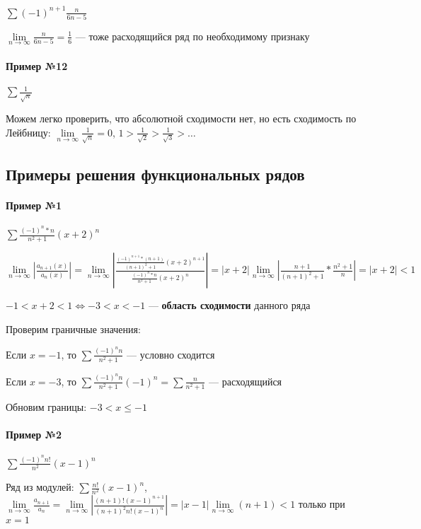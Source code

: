 \documentclass{article}
\begin{document}
$\sum (-1)^{n + 1} \frac{n}{6 n - 5}$

$\lim\limits_{n \to \infty} \frac{n}{6 n - 5} = \frac{1}{6}$ — тоже расходящийся ряд по необходимому признаку

\paragraph{Пример №12}

$\sum \frac{1}{\sqrt{n}}$

Можем легко проверить, что абсолютной сходимости нет, но есть сходимость по Лейбницу: $\lim\limits_{n \to \infty} \frac{1}{\sqrt{n}} = 0$, $1 > \frac{1}{\sqrt{2}} > \frac{1}{\sqrt{3}} > \dots$

\subsection{Примеры решения функциональных рядов}

\paragraph{Пример №1}

$\sum \frac{(-1)^{n} * n}{n^2 + 1} (x + 2)^{n}$

$\lim \limits_{n \to \infty} | \frac{a_{n + 1} (x)}{a_{n} (x)} | = \lim\limits_{n \to \infty} | \frac{\frac{(-1)^{n + 1} * (n + 1)}{(n + 1)^2 + 1} (x + 2)^{n + 1}}{\frac{(-1)^{n} * n}{n^2 + 1} (x + 2)^{n}} | = | x + 2 | \lim\limits_{n \to \infty} | \frac{n + 1}{(n + 1)^2 + 1} * \frac{n^2 + 1}{n} | = | x + 2 | < 1$

$-1 < x + 2 < 1 \Longleftrightarrow -3 < x < -1$ — \textbf{область сходимости} данного ряда

Проверим граничные значения:

Если $x = -1$, то $\sum \frac{(-1)^{n} n}{n^2 + 1}$ — условно сходится

Если $x = -3$, то $\sum \frac{(-1)^n n}{n^2 + 1} (-1)^{n} = \sum \frac{n}{n^2 + 1}$ — расходящийся

Обновим границы: $-3 < x \le -1$

\paragraph{Пример №2}

$\sum \frac{(-1)^{n} n!}{n^2} (x - 1)^{n}$

Ряд из модулей: $\sum \frac{n!}{n^2} (x - 1)^{n}$, $\lim\limits_{n \to \infty} \frac{a_{n + 1}}{a_{n}} = \lim\limits_{n \to \infty} | \frac{(n + 1)! (x - 1)^{n + 1}}{(n + 1)^2 n! (x - 1)^{n}} | = |x - 1| \lim\limits_{n \to \infty} (n + 1) < 1$ только при $x = 1$
\end{document}
